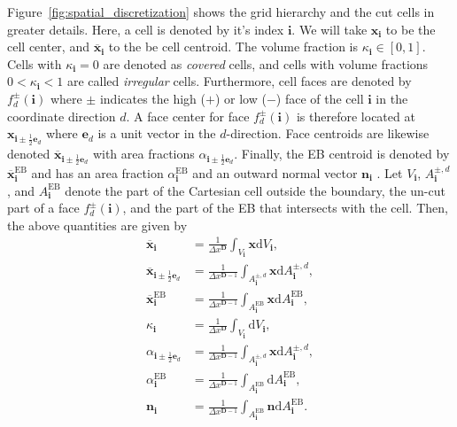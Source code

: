 \documentclass[3p]{elsarticle}
\def\diff{\ensuremath{\text{d}}}
\begin{document}
Figure~\ref{fig:spatial_discretization} shows the grid hierarchy and the cut cells in greater details. Here, a cell is denoted by it's index $\bm{i}$. We will take $\bm{x}_{\bm{i}}$ to be the cell center, and $\overline{\bm{x}}_{\bm{i}}$ to the be cell centroid. The volume fraction is $\kappa_{\bm{i}} \in [0, 1]$. Cells with $\kappa_{\bm{i}} = 0$ are denoted as \emph{covered} cells, and cells with volume fractions $0 < \kappa_{\bm{i}} < 1$ are called \emph{irregular} cells. Furthermore, cell faces are denoted by $f^\pm_d(\bm{i})$ where $\pm$ indicates the high ($+$) or low ($-$) face of the cell $\bm{i}$ in the coordinate direction $d$. A face center for face $f^\pm_d(\bm{i})$ is therefore located at $\bm{x}_{\bm{i} \pm \frac{1}{2}\mathbf{e}_d}$ where $\mathbf{e}_d$ is a unit vector in the $d$-direction. Face centroids are likewise denoted $\overline{\bm{x}}_{\bm{i} \pm \frac{1}{2}\mathbf{e}_d}$ with area fractions $\alpha_{\bm{i}\pm\frac{1}{2}\bm{e}_d}$. Finally, the EB centroid is denoted by $\overline{\bm{x}}_{\bm{i}}^{\text{EB}}$ and has an area fraction $\alpha^{\text{EB}}_{\bm{i}}$ and an outward normal vector $\bm{n}_{\bm{i}}$ . Let $V_{\bm{i}}$, $A_{\bm{i}}^{\pm, d}$, and $A_{\bm{i}}^{\text{EB}}$ denote the part of the Cartesian cell outside the boundary, the un-cut part of a face $f^{\pm}_d(\bm{i})$, and the part of the EB that intersects with the cell. Then, the above quantities are given by
\begin{subequations}
  \begin{align}
    \overline{\bm{x}}_{\bm{i}} &= \frac{1}{\Delta x^{\bm{D}}}\int_{V_{\bm{i}}}\bm{x}\diff V_{\bm{i}},\\
    \overline{\bm{x}}_{\bm{i}\pm\frac{1}{2}\bm{e}_d} &= \frac{1}{\Delta x^{\bm{D}-1}}\int_{A_{\bm{i}}^{\pm, d}}\bm{x}\diff A_{\bm{i}}^{\pm, d},\\
    \overline{\bm{x}}_{\bm{i}}^{\text{EB}} &= \frac{1}{\Delta x^{\bm{D}-1}}\int_{A_{\bm{i}}^{\text{EB}}}\bm{x}\diff A_{\bm{i}}^{\text{EB}}, \\
    \kappa_{\bm{i}} &= \frac{1}{\Delta x^{\bm{D}}}\int_{V_{\bm{i}}}\diff V_{\bm{i}},\\
    \alpha_{\bm{i}\pm\frac{1}{2}\bm{e}_d} &= \frac{1}{\Delta x^{\bm{D}-1}}\int_{A_{\bm{i}}^{\pm, d}}\bm{x}\diff A_{\bm{i}}^{\pm, d},\\
    \alpha_{\bm{i}}^{\text{EB}} &= \frac{1}{\Delta x^{\bm{D}-1}}\int_{A_{\bm{i}}^{\text{EB}}}\diff A_{\bm{i}}^{\text{EB}}, \\
    \bm{n}_{\bm{i}} &= \frac{1}{\Delta x^{\bm{D}-1}}\int_{A_{\bm{i}}^{\text{EB}}}\bm{n}\diff A_{\bm{i}}^{\text{EB}}.
  \end{align}
\end{subequations}
\end{document}
